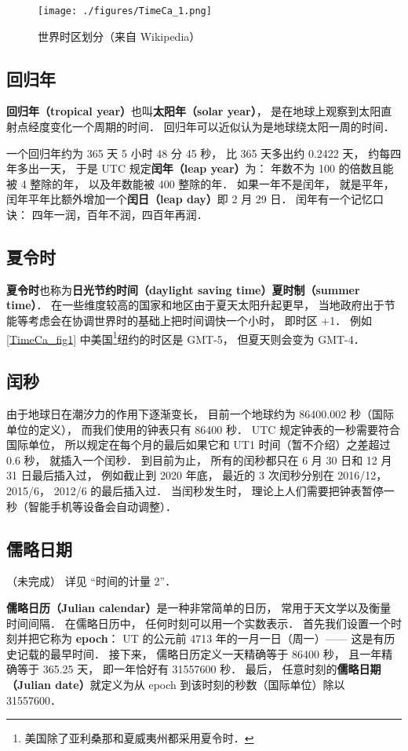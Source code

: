 \begin{figure}[ht]
\centering
\texttt{[image: ./figures/TimeCa\_1.png]}
\caption{世界时区划分（来自 Wikipedia）} \label{TimeCa_fig1}
\end{figure}

\subsection{回归年}
\textbf{回归年（tropical year）}也叫\textbf{太阳年（solar year）}， 是在地球上观察到太阳直射点经度变化一个周期的时间． 回归年可以近似认为是地球绕太阳一周的时间．

一个回归年约为 365 天 5 小时 48 分 45 秒， 比 365 天多出约 0.2422 天， 约每四年多出一天， 于是 UTC 规定\textbf{闰年（leap year）}为： 年数不为 100 的倍数且能被 4 整除的年， 以及年数能被 400 整除的年． 如果一年不是闰年， 就是平年， 闰年平年比额外增加一个\textbf{闰日（leap day）}即 2 月 29 日． 闰年有一个记忆口诀： 四年一润，百年不润，四百年再润．

\subsection{夏令时}
\textbf{夏令时}也称为\textbf{日光节约时间（daylight saving time）}\textbf{夏时制（summer time）}． 在一些维度较高的国家和地区由于夏天太阳升起更早， 当地政府出于节能等考虑会在协调世界时的基础上把时间调快一个小时， 即时区 +1． 例如\autoref{TimeCa_fig1} 中美国\footnote{美国除了亚利桑那和夏威夷州都采用夏令时．}纽约的时区是 GMT-5， 但夏天则会变为 GMT-4．

\subsection{闰秒}
由于地球日在潮汐力的作用下逐渐变长， 目前一个地球约为 86400.002 秒（国际单位的定义）， 而我们使用的钟表只有 86400 秒． UTC 规定钟表的一秒需要符合国际单位， 所以规定在每个月的最后如果它和 UT1 时间（暂不介绍）之差超过 0.6 秒， 就插入一个闰秒． 到目前为止， 所有的闰秒都只在 6 月 30 日和 12 月 31 日最后插入过， 例如截止到 2020 年底， 最近的 3 次闰秒分别在 2016/12， 2015/6， 2012/6 的最后插入过． 当闰秒发生时， 理论上人们需要把钟表暂停一秒（智能手机等设备会自动调整）．

\subsection{儒略日期}
（未完成） 详见 “时间的计量 2”．

\textbf{儒略日历（Julian calendar）}是一种非常简单的日历， 常用于天文学以及衡量时间间隔． 在儒略日历中， 任何时刻可以用一个实数表示． 首先我们设置一个时刻并把它称为 \textbf{epoch}： UT 的公元前 4713 年的一月一日（周一）—— 这是有历史记载的最早时间． 接下来， 儒略日历定义一天精确等于 86400 秒， 且一年精确等于 365.25 天， 即一年恰好有 31557600 秒． 最后， 任意时刻的\textbf{儒略日期（Julian date）}就定义为从 epoch 到该时刻的秒数（国际单位）除以 31557600． 

